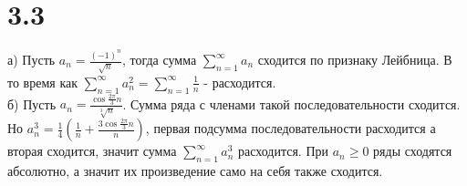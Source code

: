 \documentclass[12pt]{article}
\begin{document}
\section{3.3}
а) Пусть $a_n = \frac{(-1)^n}{\sqrt{n}}$, тогда сумма $\sum_{n=1}^{\infty} a_n$ сходится по признаку Лейбница. В то время как 
$\sum_{n=1}^{\infty} a_n^2 = \sum_{n=1}^{\infty} \frac{1}{n}$ - расходится. 
\\ б) Пусть $a_n = \frac{\cos \frac{2\pi}{3}n}{\sqrt[3]{n} }$. Сумма ряда с членами такой последовательности сходится. Но 
$a_n^3 = \frac{1}{4} \left( \frac{1}{n} + \frac{3\cos \frac{2\pi}{3}n}{n} \right)$, первая подсумма последовательности расходится а вторая сходится, 
значит сумма $\sum_{n=1}^{\infty} a_n^3$ расходится.  
При $a_n \geq 0$ ряды сходятся абсолютно, а значит их произведение само на себя также сходится. 
\end{document}

